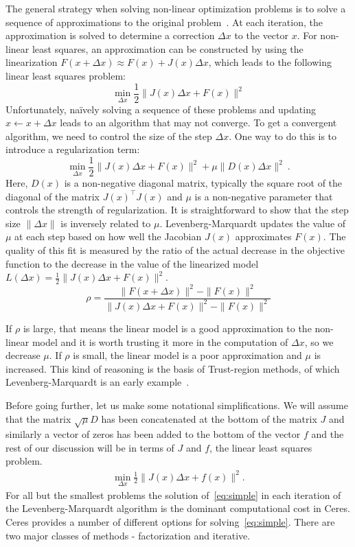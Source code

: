 The general strategy when solving non-linear optimization problems is to solve a sequence of approximations to the original problem~\cite{nocedal2000numerical}. At each iteration, the approximation is solved to determine a correction $\Delta x$ to the vector $x$. For non-linear least squares, an approximation can be constructed by using the linearization $F(x+\Delta x) \approx F(x) + J(x)\Delta x$, which leads to the following linear least squares  problem:
\begin{equation}
         \min_{\Delta x} \frac{1}{2}\|J(x)\Delta x + F(x)\|^2
        \label{eq:linearapprox}
\end{equation}
Unfortunately, na\"ively solving a sequence of these problems and updating $x \leftarrow x+ \Delta x$ leads to an algorithm that may not converge.  To get a convergent algorithm, we need to control the size of the step $\Delta x$.  One way to do this is to introduce a regularization term:
\begin{equation}
         \min_{\Delta x} \frac{1}{2}\|J(x)\Delta x + F(x)\|^2 + \mu \|D(x)\Delta x\|^2\ .
        \label{eq:lsqr}
\end{equation}
Here, $D(x)$ is a non-negative diagonal matrix, typically the square root of the diagonal of the matrix $J(x)^\top J(x)$ and $\mu$ is a non-negative parameter that controls the strength of regularization. It is straightforward to show that the step size $\|\Delta x\|$ is inversely related to $\mu$. Levenberg-Marquardt updates the value of $\mu$ at each step based on how well the Jacobian $J(x)$ approximates $F(x)$. The quality of this fit is measured by the ratio of  the actual decrease in the objective function to the decrease in the value of the linearized model $L(\Delta x) = \frac{1}{2}\|J(x)\Delta x + F(x)\|^2$.
\begin{equation}
\rho = \frac{\|F(x + \Delta x)\|^2 - \|F(x)\|^2}{\|J(x)\Delta x + F(x)\|^2 - \|F(x)\|^2}
\end{equation}

If $\rho$ is large, that means the linear model is a good approximation to the non-linear model and it is worth trusting it more in the computation of $\Delta x$, so we decrease $\mu$. If $\rho$ is small, the linear model is a poor approximation and $\mu$ is increased. This kind of reasoning is the basis of Trust-region methods, of which Levenberg-Marquardt is an early example~\cite{nocedal2000numerical}.

Before going further, let us make some notational simplifications. We will assume that the matrix $\sqrt{\mu} D$ has been concatenated at the bottom of the matrix $J$ and similarly a vector of zeros has been added to the bottom of the vector $f$ and the rest of our discussion will be in terms of $J$ and $f$, \ie the linear least squares problem.
\begin{align}
 \min_{\Delta x} \frac{1}{2} \|J(x)\Delta x + f(x)\|^2 .
 \label{eq:simple}
\end{align}
For all but the smallest problems the solution of~\eqref{eq:simple} in each iteration of the Levenberg-Marquardt algorithm is the dominant computational cost in Ceres. Ceres provides a number of different options for solving~\eqref{eq:simple}. There are two major classes of methods - factorization and iterative.

